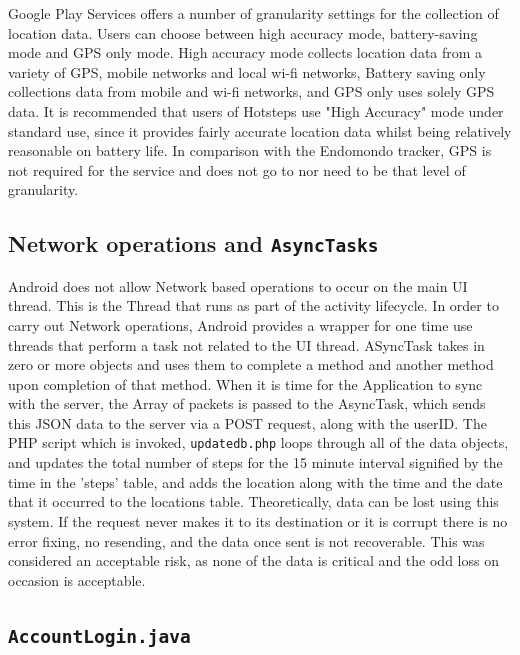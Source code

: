 \documentclass{l4proj}
\begin{document}
Google Play Services offers a number of granularity settings for the collection of location data. Users can choose between high accuracy mode, battery-saving mode and GPS only mode. High accuracy mode collects location data from a variety of GPS, mobile networks and local wi-fi networks, Battery saving only collections data from mobile and wi-fi networks, and GPS only uses solely GPS data. It is recommended that users of Hotsteps use "High Accuracy" mode under standard use, since it provides fairly accurate location data whilst being relatively reasonable on battery life. In comparison with the Endomondo tracker, GPS is not required for the service and does not go to nor need to be that level of granularity.

\subsection{Network operations and \texttt{AsyncTasks}}

Android does not allow Network based operations to occur on the main UI thread. This is the Thread that runs as part of the activity lifecycle. In order to carry out Network operations, Android provides a wrapper for one time use threads that perform a task not related to the UI thread. ASyncTask takes in zero or more objects and uses them to complete a method and another method upon completion of that method. When it is time for the Application to sync with the server, the Array of packets is passed to the AsyncTask, which sends this JSON data to the server via a POST request, along with the userID. The PHP script which is invoked, \texttt{updatedb.php} loops through all of the data objects, and updates the total number of steps for the 15 minute interval signified by the time in the 'steps' table, and adds the location along with the time and the date that it occurred to the locations table. Theoretically, data can be lost using this system. If the request never makes it to its destination or it is corrupt there is no error fixing, no resending, and the data once sent is not recoverable. This was considered an acceptable risk, as none of the data is critical and the odd loss on occasion is acceptable.

\subsection{\texttt{AccountLogin.java}}
\end{document}
